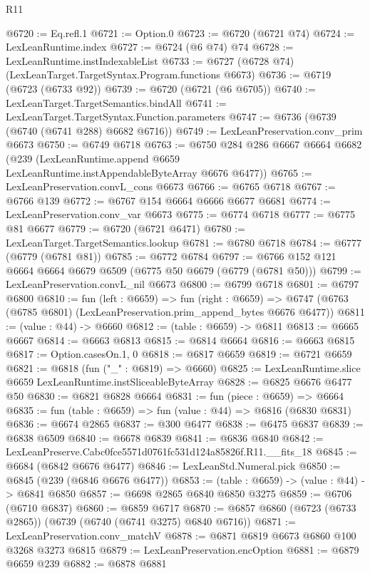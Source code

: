 \begin{lexlean}{R11}
\begin{coremodule}
@6720 := Eq.refl.{1}
@6721 := Option.{0}
@6723 := @6720 (@6721 @74)
@6724 := LexLeanRuntime.index
@6727 := @6724 (@6 @74) @74
@6728 := LexLeanRuntime.instIndexableList
@6733 := @6727 (@6728 @74) (LexLeanTarget.TargetSyntax.Program.functions @6673)
@6736 := @6719 (@6723 (@6733 @92))
@6739 := @6720 (@6721 (@6 @6705))
@6740 := LexLeanTarget.TargetSemantics.bindAll
@6741 := LexLeanTarget.TargetSyntax.Function.parameters
@6747 := @6736 (@6739 (@6740 (@6741 @288) @6682 @6716))
@6749 := LexLeanPreservation.conv_prim @6673
@6750 := @6749 @6718
@6763 := @6750
    @284
    @286
    @6667
    @6664
    @6682
    (@239 (LexLeanRuntime.append @6659 LexLeanRuntime.instAppendableByteArray @6676 @6477))
@6765 := LexLeanPreservation.convL_cons @6673
@6766 := @6765 @6718
@6767 := @6766 @139
@6772 := @6767 @154 @6664 @6666 @6677 @6681
@6774 := LexLeanPreservation.conv_var @6673
@6775 := @6774 @6718
@6777 := @6775 @81 @6677
@6779 := @6720 (@6721 @6471)
@6780 := LexLeanTarget.TargetSemantics.lookup
@6781 := @6780 @6718
@6784 := @6777 (@6779 (@6781 @81))
@6785 := @6772 @6784
@6797 := @6766 @152 @121 @6664 @6664 @6679 @6509 (@6775 @50 @6679 (@6779 (@6781 @50)))
@6799 := LexLeanPreservation.convL_nil @6673
@6800 := @6799 @6718
@6801 := @6797 @6800
@6810 := fun (left : @6659) =>
  fun (right : @6659) =>
  @6747 (@6763 (@6785 @6801) (LexLeanPreservation.prim_append_bytes @6676 @6477))
@6811 := (value : @44) -> @6660
@6812 := (table : @6659) -> @6811
@6813 := @6665 @6667
@6814 := @6663 @6813
@6815 := @6814 @6664
@6816 := @6663 @6815
@6817 := Option.casesOn.{1, 0}
@6818 := @6817 @6659
@6819 := @6721 @6659
@6821 := @6818 (fun ("_" : @6819) => @6660)
@6825 := LexLeanRuntime.slice @6659 LexLeanRuntime.instSliceableByteArray
@6828 := @6825 @6676 @6477 @50
@6830 := @6821 @6828 @6664
@6831 := fun (piece : @6659) => @6664
@6835 := fun (table : @6659) => fun (value : @44) => @6816 (@6830 @6831)
@6836 := @6674 @2865
@6837 := @300 @6477
@6838 := @6475 @6837
@6839 := @6838 @6509
@6840 := @6678 @6839
@6841 := @6836 @6840
@6842 := LexLeanPreserve.Cabc0fce5571d0761fc531d124a85826f.R11.__fits_18
@6845 := @6684 (@6842 @6676 @6477)
@6846 := LexLeanStd.Numeral.pick
@6850 := @6845 (@239 (@6846 @6676 @6477))
@6853 := (table : @6659) -> (value : @44) -> @6841 @6850
@6857 := @6698 @2865 @6840 @6850 @3275
@6859 := @6706 (@6710 @6837)
@6860 := @6859 @6717
@6870 := @6857 @6860 (@6723 (@6733 @2865)) (@6739 (@6740 (@6741 @3275) @6840 @6716))
@6871 := LexLeanPreservation.conv_matchV
@6878 := @6871 @6819 @6673 @6860 @100 @3268 @3273 @6815
@6879 := LexLeanPreservation.encOption
@6881 := @6879 @6659 @239
@6882 := @6878 @6881

\end{coremodule}
\end{lexlean}

